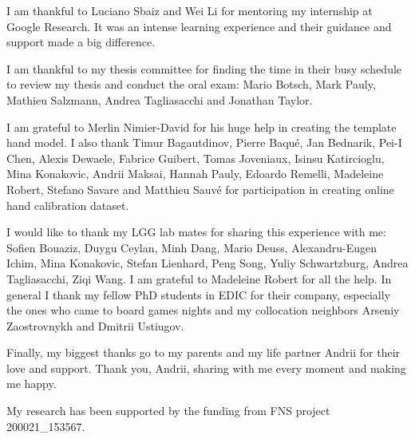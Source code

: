 I am thankful to Luciano Sbaiz and Wei Li for mentoring my internship at Google Research. It was an intense learning experience and their guidance and support made a big difference.

I am thankful to my thesis committee for finding the time in their busy schedule to review my thesis and conduct the oral exam: Mario Botsch, Mark Pauly, Mathieu Salzmann, Andrea Tagliasacchi and Jonathan Taylor.

I am grateful to Merlin Nimier-David for his huge help in creating the template hand model. I also thank Timur Bagautdinov, Pierre Baqué, Jan Bednarik, Pei-I Chen, Alexis Dewaele, Fabrice Guibert, Tomas Joveniaux, Isinsu Katircioglu, Mina Konakovic, Andrii Maksai, Hannah Pauly, Edoardo Remelli, Madeleine Robert, Stefano Savare and Matthieu Sauvé for participation in creating online hand calibration dataset.

I would like to thank my LGG lab mates for sharing this experience with me: Sofien Bouaziz, Duygu Ceylan, Minh Dang, Mario Deuss, Alexandru-Eugen Ichim, Mina Konakovic, Stefan Lienhard, Peng Song, Yuliy Schwartzburg, Andrea Tagliasacchi, Ziqi Wang. I am grateful to Madeleine Robert for all the help. In general I thank my fellow PhD students in EDIC for their company, especially the ones who came to board games nights and my collocation neighbors Arseniy Zaostrovnykh and Dmitrii Ustiugov.

Finally, my biggest thanks go to my parents and my life partner Andrii for their love and support. Thank you, Andrii, sharing with me every moment and making me happy.

My research has been supported by the funding from FNS project 200021\_153567.

 
